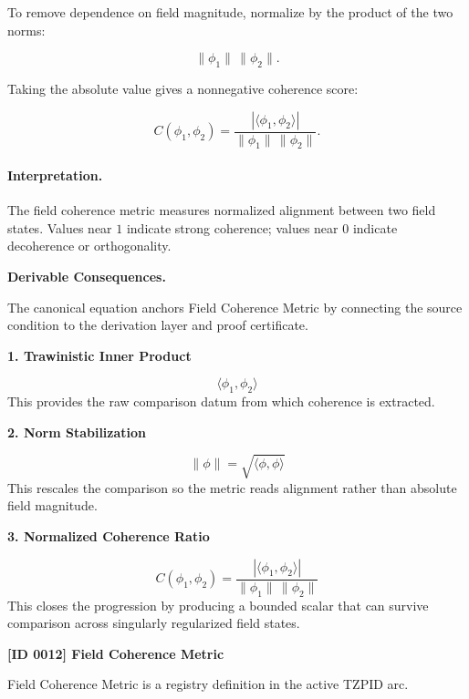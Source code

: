 To remove dependence on field magnitude, normalize by the product of the two norms:

\begin{equation}
\lVert \phi_1\rVert\,\lVert \phi_2\rVert .
\end{equation}

Taking the absolute value gives a nonnegative coherence score:

\begin{equation}
\boxed{
C(\phi_1,\phi_2)
=
\frac{
\left|\langle \phi_1,\phi_2\rangle\right|
}{
\lVert \phi_1\rVert\,\lVert \phi_2\rVert
}.
}
\end{equation}

\paragraph{Interpretation.}
The field coherence metric measures normalized alignment between two field states. Values near $1$ indicate strong coherence; values near $0$ indicate decoherence or orthogonality.

\par\vspace{0.35em}
\noindent\textbf{Derivable Consequences.}\quad
\begingroup
\footnotesize
\raggedright
The canonical equation anchors Field Coherence Metric by connecting the source condition to the derivation layer and proof certificate.
\par\endgroup

\noindent\textbf{1. Trawinistic Inner Product}\par
\[
\langle \phi_{1},\phi_{2}\rangle
\]
\noindent This provides the raw comparison datum from which coherence is extracted.\par
\noindent\textbf{2. Norm Stabilization}\par
\[
\|\phi\| = \sqrt{\langle \phi,\phi\rangle}
\]
\noindent This rescales the comparison so the metric reads alignment rather than absolute field magnitude.\par
\noindent\textbf{3. Normalized Coherence Ratio}\par
\[
C(\phi_{1},\phi_{2})
=
\frac{\left|\langle \phi_{1},\phi_{2}\rangle\right|}
{\|\phi_{1}\|\,\|\phi_{2}\|}
\]
\noindent This closes the progression by producing a bounded scalar that can survive comparison across singularly regularized field states.\par

\clearpage
\noindent\textbf{[ID 0012] Field Coherence Metric}\par
\vspace{0.35em}
\begingroup\small
{}
Field Coherence Metric is a registry definition in the active TZPID arc.

